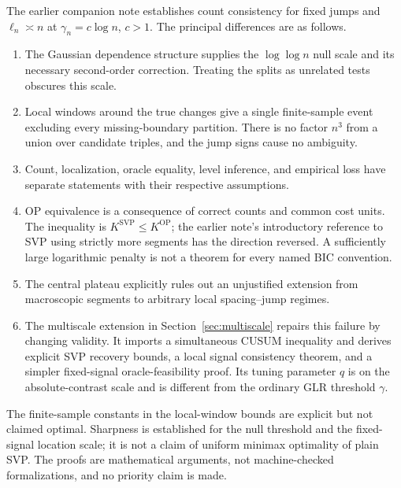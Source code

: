 \documentclass[pdflatex,sn-mathphys-num]{sn-jnl}
\theoremstyle{thmstyleone}
\theoremstyle{thmstyletwo}
\begin{document}
The earlier companion note establishes count consistency for fixed jumps
and $\ell_n\asymp n$ at $\gamma_n=c\log n$, $c>1$.
The principal differences are as follows.
\begin{enumerate}
\item The Gaussian dependence structure supplies the $\log\log n$ null
scale and its necessary second-order correction. Treating the splits as
unrelated tests obscures this scale.
\item Local windows around the true changes give a single finite-sample
event excluding every missing-boundary partition. There is no factor $n^3$
from a union over candidate triples, and the jump signs cause no ambiguity.
\item Count, localization, oracle equality, level inference, and empirical
loss have separate statements with their respective assumptions.
\item OP equivalence is a consequence of correct counts and common cost
units. The inequality is $K^{\mathrm{SVP}}\le K^{\mathrm{OP}}$; the earlier
note's introductory reference to SVP using strictly more segments has the
direction reversed. A sufficiently large logarithmic penalty is not a
theorem for every named BIC convention.
\item The central plateau explicitly rules out an unjustified extension
from macroscopic segments to arbitrary local spacing--jump regimes.
\item The multiscale extension in Section~\ref{sec:multiscale} repairs this
failure by changing validity. It imports a simultaneous CUSUM inequality
and derives explicit SVP recovery bounds, a local signal consistency theorem,
and a simpler fixed-signal oracle-feasibility proof. Its tuning parameter
$q$ is on the absolute-contrast scale and is different from the ordinary
GLR threshold $\gamma$.
\end{enumerate}
The finite-sample constants in the local-window bounds are explicit but
not claimed optimal. Sharpness is established for the null threshold and
the fixed-signal location scale; it is not a claim of uniform minimax
optimality of plain SVP. The proofs are mathematical arguments, not
machine-checked formalizations, and no priority claim is made.
\end{document}
